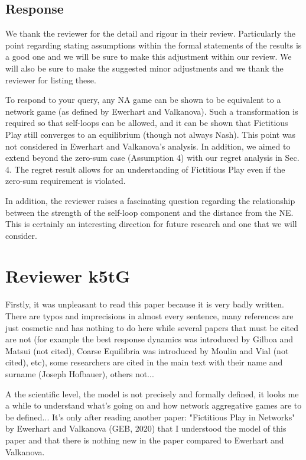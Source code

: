 \documentclass{article}
\begin{document}
	\subsection{Response}
	
	We thank the reviewer for the detail and rigour in their review. Particularly the point regarding stating assumptions within the formal statements of the results is a good one and we will be sure to make this adjustment within our review. We will also be sure to make the suggested minor adjustments and we thank the reviewer for listing these. 
	
	To respond to your query, any NA game can be shown to be equivalent to a network game (as defined by Ewerhart and Valkanova). Such a transformation is required so that self-loops can be allowed, and it can be shown that Fictitious Play still converges to an equilibrium (though not always Nash). This point was not considered in Ewerhart and Valkanova's analysis. In addition, we aimed to extend beyond the zero-sum case (Assumption 4) with our regret analysis in Sec. 4. The regret result allows for an understanding of Fictitious Play even if the zero-sum requirement is violated.
	
	In addition, the reviewer raises a fascinating question regarding the relationship between the strength of the self-loop component and the distance from the NE. This is certainly an interesting direction for future research and one that we will consider.
	
	
	\section{Reviewer k5tG}
	
	Firstly, it was unpleasant to read this paper because it is very badly written. There are typos and imprecisions in almost every sentence, many references are just cosmetic and has nothing to do here while several papers that must be cited are not (for example the best response dynamics was introduced by Gilboa and Matsui (not cited), Coarse Equilibria was introduced by Moulin and Vial (not cited), etc), some researchers are cited in the main text with their name and surname (Joseph Hofbauer), others not...
	
	A the scientific level, the model is not precisely and formally defined, it looks me a while to understand what's going on and how network aggregative games are to be defined... It's only after reading another paper: "Fictitious Play in Networks" by Ewerhart and Valkanova (GEB, 2020) that I understood the model of this paper and that there is nothing new in the paper compared to Ewerhart and Valkanova.
	
\end{document}
